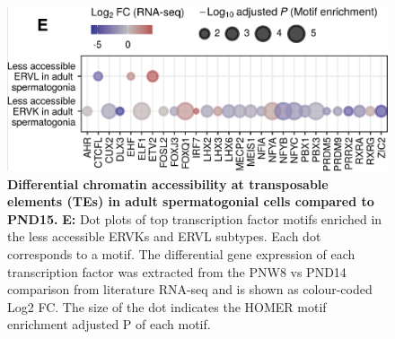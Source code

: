 \documentclass[12pt,twoside]{reedthesis}
\begin{document}
\begin{subfigures}
\begin{figure}[H]

{\centering \includegraphics{thesis_files/figure-latex/df5b-1} 

}

\caption[Differential chromatin accessibility at transposable elements (TEs) in adult spermatogonial cells compared to PND15]{ \textbf{Differential chromatin accessibility at transposable elements (TEs) in adult spermatogonial cells compared to PND15.} \newline \textbf{E:} Dot plots of top transcription factor motifs enriched in the less accessible ERVKs and ERVL subtypes. Each dot corresponds to a motif. The differential gene expression of each transcription factor was extracted from the PNW8 vs PND14 comparison from literature RNA-seq and is shown as colour-coded Log2 FC. The size of the dot indicates the HOMER motif enrichment adjusted P of each motif.}\label{fig:df5b}
\end{figure}
\end{subfigures}
\end{document}
